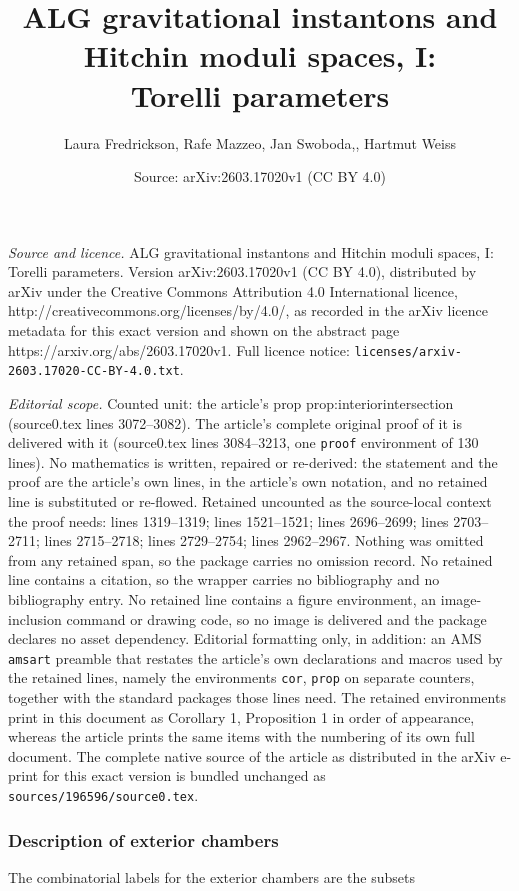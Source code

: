 \documentclass[10pt,a4paper]{amsart}
\title{ALG gravitational instantons and Hitchin moduli spaces, I: \\ Torelli parameters}
\author{Laura Fredrickson, Rafe Mazzeo, Jan Swoboda,, Hartmut Weiss}
\date{Source: arXiv:2603.17020v1 (CC BY 4.0)}
\begin{document}
\maketitle

\noindent\emph{Source and licence.} ALG gravitational instantons and Hitchin moduli spaces, I: \\ Torelli parameters. Version arXiv:2603.17020v1 (CC BY 4.0), distributed by arXiv under the Creative Commons Attribution 4.0 International licence, http://creativecommons.org/licenses/by/4.0/, as recorded in the arXiv licence metadata for this exact version and shown on the abstract page https://arxiv.org/abs/2603.17020v1. Full licence notice: \texttt{licenses/arxiv-2603.17020-CC-BY-4.0.txt}.\par\smallskip

\noindent\textit{Editorial scope.} Counted unit: the article's prop prop:interiorintersection (source0.tex lines 3072--3082). The article's complete original proof of it is delivered with it (source0.tex lines 3084--3213, one \texttt{proof} environment of 130 lines). No mathematics is written, repaired or re-derived: the statement and the proof are the article's own lines, in the article's own notation, and no retained line is substituted or re-flowed.  Retained uncounted as the source-local context the proof needs: lines 1319--1319; lines 1521--1521; lines 2696--2699; lines 2703--2711; lines 2715--2718; lines 2729--2754; lines 2962--2967.  Nothing was omitted from any retained span, so the package carries no omission record.  No retained line contains a citation, so the wrapper carries no bibliography and no bibliography entry.  No retained line contains a figure environment, an image-inclusion command or drawing code, so no image is delivered and the package declares no asset dependency.  Editorial formatting only, in addition: an AMS \texttt{amsart} preamble that restates the article's own declarations and macros used by the retained lines, namely the environments \texttt{cor}, \texttt{prop} on separate counters, together with the standard packages those lines need.  The retained environments print in this document as Corollary 1, Proposition 1 in order of appearance, whereas the article prints the same items with the numbering of its own full document.  The complete native source of the article as distributed in the arXiv e-print for this exact version is bundled unchanged as \texttt{sources/196596/source0.tex}.
\subsubsection{Description of exterior chambers}\label{sec:exteriorchambers} The combinatorial labels for the exterior chambers are the subsets 
\end{document}
